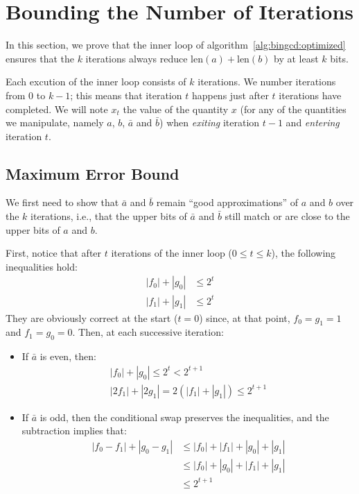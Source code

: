 \documentclass{llncs}
\newcommand{\bitlength}{\text{len}}
\begin{document}
\appendix

\section{Bounding the Number of Iterations}\label{sec:iterbound}

In this section, we prove that the inner loop of
algorithm~\ref{alg:bingcd:optimized} ensures that the $k$ iterations
always reduce $\bitlength(a)+\bitlength(b)$ by at least $k$ bits.

Each excution of the inner loop consists of $k$ iterations. We number
iterations from $0$ to $k-1$; this means that iteration $t$ happens just
after $t$ iterations have completed. We will note $x_t$ the value of the
quantity $x$ (for any of the quantities we manipulate, namely $a$, $b$,
$\bar a$ and $\bar b$) when \emph{exiting} iteration $t-1$ and
\emph{entering} iteration $t$.

\subsection{Maximum Error Bound}\label{sec:iterbound:error}

We first need to show that $\bar a$ and $\bar b$ remain ``good
approximations'' of $a$ and $b$ over the $k$ iterations, i.e.,
that the upper bits of $\bar a$ and $\bar b$ still match or are
close to the upper bits of $a$ and $b$.

First, notice that after $t$ iterations of the inner loop
($0\leq t\leq k$), the following inequalities hold:
\begin{align*}
    |f_0| + |g_0| &\leq 2^t \\
    |f_1| + |g_1| &\leq 2^t
\end{align*}
They are obviously correct at the start ($t = 0$) since, at that point,
$f_0 = g_1 = 1$ and $f_1 = g_0 = 0$. Then, at each successive iteration:
\begin{itemize}

    \item If $\bar a$ is even, then:
    \begin{equation*}
        \begin{gathered}
            |f_0| + |g_0| \leq 2^t < 2^{t+1} \\
            |2f_1| + |2g_1| = 2(|f_1| + |g_1|) \leq 2^{t+1}
        \end{gathered}
    \end{equation*}

    \item If $\bar a$ is odd, then the conditional swap preserves the
    inequalities, and the subtraction implies that:
    \begin{align*}
        |f_0 - f_1| + |g_0 - g_1| &\leq |f_0| + |f_1| + |g_0| + |g_1| \\
                                  &\leq |f_0| + |g_0| + |f_1| + |g_1| \\
                                  &\leq 2^{t+1}
    \end{align*}

\end{itemize}
\end{document}
